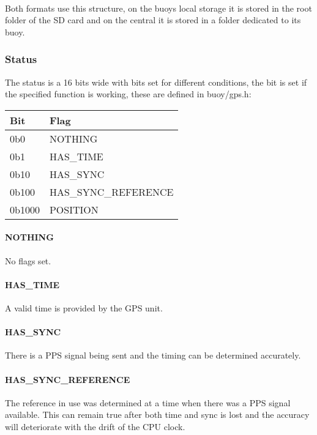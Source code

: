 \documentclass[a4paper]{article}
\begin{document}
\begin{multicols}{2}
    \paragraph{}
    Both formats use this structure, on the buoys local storage it is
    stored in the root folder of the SD card and on the central it is
    stored in a folder dedicated to its buoy.

    \subsubsection{Status} The status is a 16 bits wide with bits set for
    different conditions, the bit is set if the specified function is
    working, these are defined in buoy/gps.h: \\

    \vspace{1em}

    \begin{tabular}{|l|l|}
      \hline
      \bfseries Bit & \bfseries Flag \\ \hline
       0b0    &   NOTHING \\ \hline
       0b1    &   HAS\_TIME    \\ \hline
       0b10   &   HAS\_SYNC    \\ \hline
       0b100  &   HAS\_SYNC\_REFERENCE \\ \hline
       0b1000 &   POSITION \\ \hline
    \end{tabular}
    \label{tab:status_flags}

    \paragraph{NOTHING} No flags set.

    \paragraph{HAS\_TIME} A valid time is provided by the GPS
    unit.
    \paragraph{HAS\_SYNC} There is a PPS signal being sent and the
    timing can be determined accurately.

    \paragraph{HAS\_SYNC\_REFERENCE} The reference in use was
    determined at a time when there was a PPS signal available. This can
    remain true after both time and sync is lost and the accuracy will
    deteriorate with the drift of the CPU clock.


\end{multicols}
\end{document}

